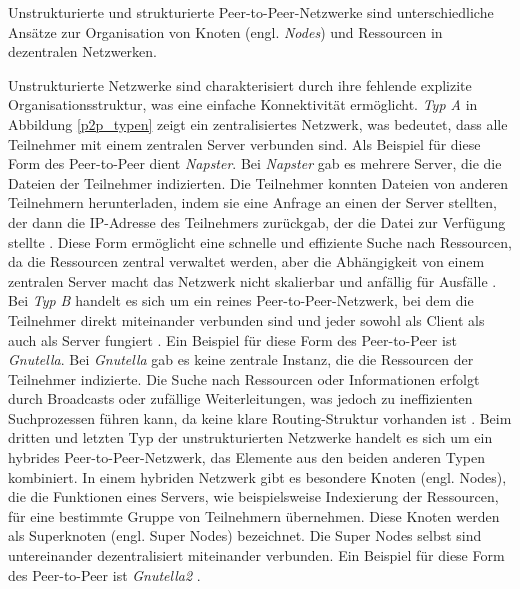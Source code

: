 \noindent Unstrukturierte und strukturierte Peer-to-Peer-Netzwerke sind unterschiedliche Ansätze zur Organisation von Knoten (engl. \textit{Nodes}) und Ressourcen in dezentralen Netzwerken.

Unstrukturierte Netzwerke sind charakterisiert durch ihre fehlende explizite Organisationsstruktur, was eine einfache Konnektivität ermöglicht. \textit{Typ A} in Abbildung \ref{p2p_typen} zeigt ein zentralisiertes Netzwerk, was bedeutet, dass alle Teilnehmer mit einem zentralen Server verbunden sind. Als Beispiel für diese Form des Peer-to-Peer dient \textit{Napster}. Bei \textit{Napster} gab es mehrere Server, die die Dateien der Teilnehmer indizierten. Die Teilnehmer konnten Dateien von anderen Teilnehmern herunterladen, indem sie eine Anfrage an einen der Server stellten, der dann die IP-Adresse des Teilnehmers zurückgab, der die Datei zur Verfügung stellte \parencite[S. 171]{Saroiu_MeasuringAndAnalyzingNapsterAndGnutellaHosts}. Diese Form ermöglicht eine schnelle und effiziente Suche nach Ressourcen, da die Ressourcen zentral verwaltet werden, aber die Abhängigkeit von einem zentralen Server macht das Netzwerk nicht skalierbar und anfällig für Ausfälle \parencite[S. 732]{Khatibi_StructuredUnstructuredP2P}.
Bei \textit{Typ B} handelt es sich um ein reines Peer-to-Peer-Netzwerk, bei dem die Teilnehmer direkt miteinander verbunden sind und jeder sowohl als Client als auch als Server fungiert \parencite[S. 732]{Khatibi_StructuredUnstructuredP2P}. Ein Beispiel für diese Form des Peer-to-Peer ist \textit{Gnutella}. Bei \textit{Gnutella} gab es keine zentrale Instanz, die die Ressourcen der Teilnehmer indizierte. Die Suche nach Ressourcen oder Informationen erfolgt durch Broadcasts oder zufällige Weiterleitungen, was jedoch zu ineffizienten Suchprozessen führen kann, da keine klare Routing-Struktur vorhanden ist \parencite[S. 171]{Saroiu_MeasuringAndAnalyzingNapsterAndGnutellaHosts}. Beim dritten und letzten Typ der unstrukturierten Netzwerke handelt es sich um ein hybrides Peer-to-Peer-Netzwerk, das Elemente aus den beiden anderen Typen kombiniert. In einem hybriden Netzwerk gibt es besondere Knoten (engl. Nodes), die die Funktionen eines Servers, wie beispielsweise Indexierung der Ressourcen, für eine bestimmte Gruppe von Teilnehmern übernehmen. Diese Knoten werden als Superknoten (engl. Super Nodes) bezeichnet. Die Super Nodes selbst sind untereinander dezentralisiert miteinander verbunden. Ein Beispiel für diese Form des Peer-to-Peer ist \textit{Gnutella2} \parencite[S. 732]{Khatibi_StructuredUnstructuredP2P}. 

